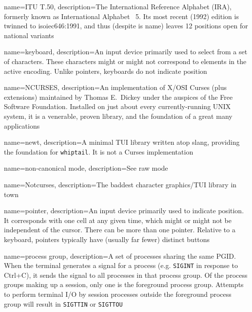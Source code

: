 {
  name={ITU T.50},
  description={The International Reference Alphabet (IRA), formerly known as
   International Alphabet \textnumero\ 5. Its most recent (1992)
   edition is twinned to \Gls{isoiec646}:1991, and thus (despite is name)
   leaves 12 positions open for national variants}
}

{
  name={keyboard},
  description={An input device primarily used to select from a set of
  characters. These characters might or might not correspond to elements in
  the active encoding. Unlike pointers, keyboards do not indicate position}
}

{
  name={NCURSES},
description={An implementation of X/OSI Curses (plus extensions) maintained by
  Thomas E.\ Dickey under the auspices of the Free Software Foundation.
  Installed on just about every currently-running UNIX system, it is a
  venerable, proven library, and the foundation of a great many applications}
}

{
  name={newt},
description={A minimal TUI library written atop slang, providing the foundation
  for \texttt{whiptail}. It is not a Curses implementation}
}

{
  name={non-canonical mode},
description={See \gls{raw mode}}
}

{
  name={Notcurses},
description={The baddest character graphics/TUI library in town}
}

{
  name={pointer},
description={An input device primarily used to indicate position. It
  corresponds with one cell at any given time, which might or might not be
  independent of the cursor. There can be more than one pointer. Relative to a
  \gls{keyboard}, pointers typically have (usually far fewer) distinct buttons}
}

{
  name={process group},
description={A set of processes sharing the same PGID. When the terminal
  generates a signal for a process (e.g. \texttt{SIGINT} in response to Ctrl+C), it
  sends the signal to all processes in that process group. Of the process
  groups making up a session, only one is the foreground process group.
  Attempts to perform terminal I/O by session processes outside the foreground
  process group will result in \texttt{SIGTTIN} or \texttt{SIGTTOU}}
}

